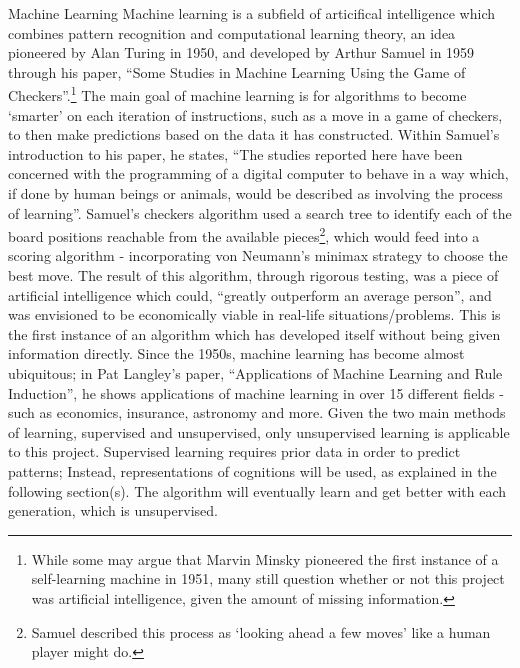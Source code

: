 \documentclass[12pt,a4paper]{article}
\makeatletter
\renewcommand\subsection{\@startsection {subsection}{1}{2mm}
                               {3pt plus 2pt minus 1pt}
                               {3pt plus 0pt}
                               {\normalfont\bfseries}}
\makeatother
\begin{document}
\subsection{Machine Learning}
Machine learning is a subfield of articifical intelligence which combines pattern recognition and computational learning theory, an idea pioneered by Alan Turing in 1950, and developed by Arthur Samuel in 1959 through his paper, “Some Studies in Machine Learning Using the Game of Checkers”\cite{29}.\footnote{While some may argue that Marvin Minsky pioneered the first instance of a self-learning machine in 1951, many still question whether or not this project was artificial intelligence, given the amount of missing information.} The main goal of machine learning is for algorithms to become `smarter' on each iteration of instructions, such as a move in a game of checkers, to then make predictions based on the data it has constructed. Within Samuel's introduction to his paper, he states, “The studies reported here have been concerned with the programming of a digital computer to behave in a way which, if done by human beings or animals, would be described as involving the process of learning”\cite[p.~1]{29}. Samuel's checkers algorithm used a search tree to identify each of the board positions reachable from the available pieces\footnote{Samuel described this process as `looking ahead a few moves' like a human player might do.}, which would feed into a scoring algorithm - incorporating von Neumann's minimax strategy to choose the best move. The result of this algorithm, through rigorous testing, was a piece of artificial intelligence which could, “greatly outperform an average person”, and was envisioned to be economically viable in real-life situations/problems. This is the first instance of an algorithm which has developed itself without being given information directly. Since the 1950s, machine learning has become almost ubiquitous; in Pat Langley's paper, “Applications of Machine Learning and Rule Induction”\cite{18}, he shows applications of machine learning in over 15 different fields - such as economics, insurance, astronomy and more. Given the two main methods of learning, supervised and unsupervised, only unsupervised learning is applicable to this project. Supervised learning requires prior data in order to predict patterns; Instead, representations of cognitions will be used, as explained in the following section(s). The algorithm will eventually learn and get better with each generation, which is unsupervised. \\
\end{document}
